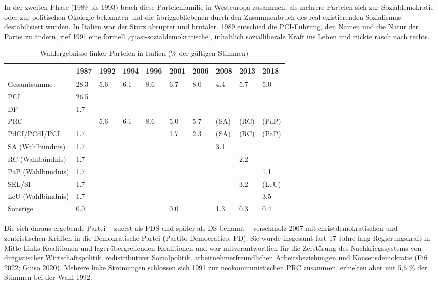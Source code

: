 \begin{multicols*}{2}
In der zweiten Phase (1989 bis 1993) brach diese Parteienfamilie in Westeuropa zusammen, als mehrere Parteien sich zur Sozialdemokratie oder zur politischen Ökologie bekannten und die übriggebliebenen durch den Zusammenbruch des real existierenden Sozialismus destabilisiert wurden. In Italien war der Sturz abrupter und brutaler. 1989 entschied die PCI-Führung, den Namen und die Natur der Partei zu ändern, rief 1991 eine formell ‚quasi-sozialdemokratische‘, inhaltlich sozialliberale Kraft ins Leben und rückte rasch nach rechts. 

\begin{table}
    \caption{Wahlergebnisse linker Parteien in Italien (\% der gültigen Stimmen)}
    \begin{tabular}[h]{l|l|l|l|l|l|l|l|l|l}
        & 1987 & 1992 & 1994 &  1996 & 2001 & 2006 & 2008 & 2013 & 2018\\\hline
        Gesamtsumme & 28.3 & 5.6  & 6.1  & 8.6   & 6.7  & 8.0  & 4.4  & 5.7  & 5.0 \\
        PCI & 26.5 &   &   &    &   &   &   &   &  \\
        DP & 1.7 &   &   &    &   &   &   &   &  \\
        PRC & & 5.6  &  6.1 &  8.6  &  5.0 & 5.7  &  (SA) & (RC)  & (PaP)  \\
        PdCI/PCdI/PCI & 1.7 &   &   &    & 1.7  & 2.3  &  (SA) & (RC)  & (PaP) \\
        SA (Wahlbündnis) & 1.7 &   &   &    &   &   & 3.1  &   &  \\
        RC (Wahlbündnis) & 1.7 &   &   &    &   &   &   & 2.2  &  \\
        PaP (Wahlbündnis) & 1.7 &   &   &    &   &   &   &   & 1.1 \\
        SEL/SI & 1.7 &   &   &    &   &   &   &  3.2 & (LeU) \\
        LeU (Wahlbündnis) & 1.7 &   &   &    &   &   &   &   & 3.5 \\
        Sonstige & 0.0 &   &   &    & 0.0 &   & 1.3 & 0.3 &  0.4\\
    \end{tabular}
\end{table}

Die sich daraus ergebende Partei – zuerst als PDS und später als DS benannt – verschmolz 2007 mit christdemokratischen und zentristischen Kräften in die Demokratische Partei (Partito Democratico, PD). Sie wurde insgesamt fast 17 Jahre lang Regierungskraft in Mitte-Links-Koalitionen und lagerübergreifenden Koalitionen und war mitverantwortlich für die Zerstörung des Nachkriegssystems von dirigistischer Wirtschaftspolitik, redistributiver Sozialpolitik, arbeitnehmerfreundlichen Arbeitsbeziehungen und Konsensdemokratie (Fifi 2022; Guiso 2020).  Mehrere linke Strömungen schlossen sich 1991 zur neokommunistischen PRC zusammen, erhielten aber nur 5,6 \% der Stimmen bei der Wahl 1992.


\end{multicols*}
